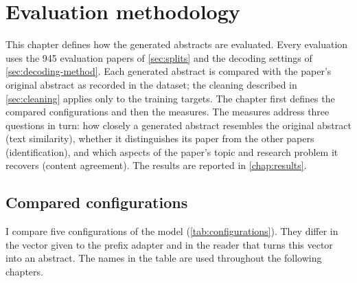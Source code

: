\chapter{Evaluation methodology}
\label{chap:evaluation}

This chapter defines how the generated abstracts are evaluated. Every evaluation uses the 945 evaluation papers of \autoref{sec:splits} and the decoding settings of \autoref{sec:decoding-method}. Each generated abstract is compared with the paper's original abstract as recorded in the dataset; the cleaning described in \autoref{sec:cleaning} applies only to the training targets. The chapter first defines the compared configurations and then the measures. The measures address three questions in turn: how closely a generated abstract resembles the original abstract (text similarity), whether it distinguishes its paper from the other papers (identification), and which aspects of the paper's topic and research problem it recovers (content agreement). The results are reported in \autoref{chap:results}.

\section{Compared configurations}
\label{sec:configurations}

I compare five configurations of the model (\autoref{tab:configurations}). They differ in the vector given to the prefix adapter and in the reader that turns this vector into an abstract. The names in the table are used throughout the following chapters.

